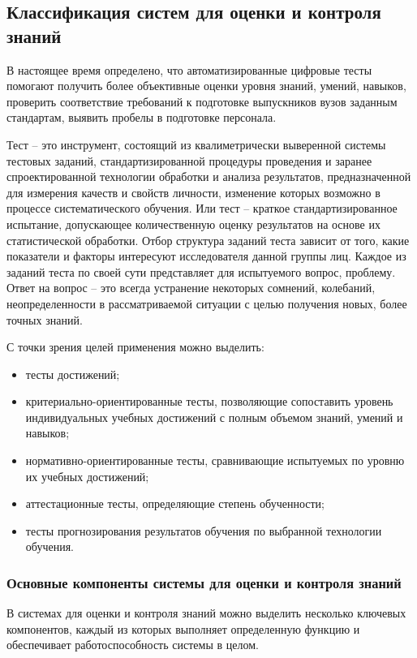 \subsection{Классификация систем для оценки и контроля знаний}

В настоящее время определено, что автоматизированные цифровые тесты помогают
получить более объективные оценки уровня знаний, умений, навыков,
проверить соответствие требований к подготовке выпускников вузов заданным
стандартам, выявить пробелы в подготовке персонала.

Тест – это инструмент, состоящий из квалиметрически выверенной системы тестовых заданий, стандартизированной процедуры проведения и заранее спроектированной технологии обработки и анализа результатов, предназначенной для измерения качеств и свойств личности, изменение которых возможно в процессе систематического обучения. Или тест – краткое стандартизированное испытание, допускающее количественную оценку результатов на основе их
статистической обработки. Отбор структура заданий теста зависит от того, какие показатели и факторы интересуют исследователя данной группы лиц. Каждое из заданий теста по своей сути представляет для испытуемого вопрос, проблему. Ответ на вопрос – это всегда устранение некоторых сомнений, колебаний, неопределенности в рассматриваемой ситуации с целью получения новых, более точных знаний.

С точки зрения целей применения можно выделить:
\begin{itemize}
	\item тесты достижений;
	\item критериально-ориентированные тесты, позволяющие сопоставить
	уровень индивидуальных учебных достижений с полным объемом знаний,
	умений и навыков;
	\item нормативно-ориентированные тесты, сравнивающие испытуемых по
	уровню их учебных достижений;
	\item аттестационные тесты, определяющие степень обученности;
	\item тесты прогнозирования результатов обучения по выбранной
	технологии обучения.
\end{itemize}

\subsubsection{Основные компоненты системы для оценки и контроля знаний}

В системах для оценки и контроля знаний можно выделить несколько ключевых компонентов, каждый из которых выполняет определенную функцию и обеспечивает работоспособность системы в целом.

